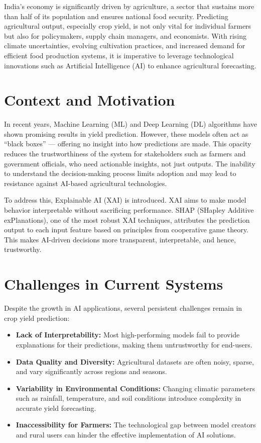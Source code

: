 \documentclass[a4paper,11pt,oneside]{book}
\begin{document}
India's economy is significantly driven by agriculture, a sector that sustains more than half of its population and ensures national food security. Predicting agricultural output, especially crop yield, is not only vital for individual farmers but also for policymakers, supply chain managers, and economists. With rising climate uncertainties, evolving cultivation practices, and increased demand for efficient food production systems, it is imperative to leverage technological innovations such as Artificial Intelligence (AI) to enhance agricultural forecasting.

\section{Context and Motivation}

In recent years, Machine Learning (ML) and Deep Learning (DL) algorithms have shown promising results in yield prediction. However, these models often act as “black boxes” — offering no insight into how predictions are made. This opacity reduces the trustworthiness of the system for stakeholders such as farmers and government officials, who need actionable insights, not just outputs. The inability to understand the decision-making process limits adoption and may lead to resistance against AI-based agricultural technologies.

To address this, Explainable AI (XAI) is introduced. XAI aims to make model behavior interpretable without sacrificing performance. SHAP (SHapley Additive exPlanations), one of the most robust XAI techniques, attributes the prediction output to each input feature based on principles from cooperative game theory. This makes AI-driven decisions more transparent, interpretable, and hence, trustworthy.

\section{Challenges in Current Systems}

Despite the growth in AI applications, several persistent challenges remain in crop yield prediction:

\begin{itemize}
    \item \textbf{Lack of Interpretability:} Most high-performing models fail to provide explanations for their predictions, making them untrustworthy for end-users.
    \item \textbf{Data Quality and Diversity:} Agricultural datasets are often noisy, sparse, and vary significantly across regions and seasons.
    \item \textbf{Variability in Environmental Conditions:} Changing climatic parameters such as rainfall, temperature, and soil conditions introduce complexity in accurate yield forecasting.
    \item \textbf{Inaccessibility for Farmers:} The technological gap between model creators and rural users can hinder the effective implementation of AI solutions.
\end{itemize}
\end{document}

